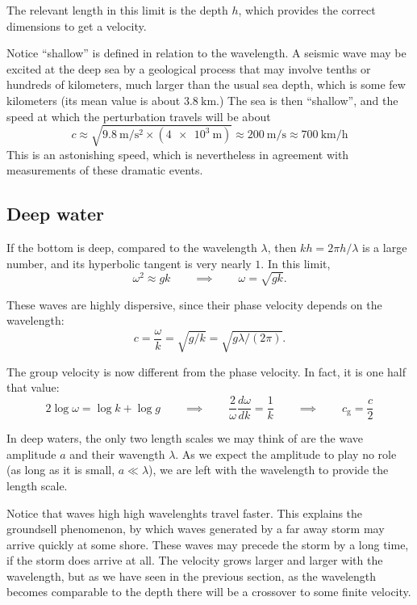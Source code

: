 The relevant length in this limit is the depth $h$, which provides the
correct dimensions to get a velocity.






Notice ``shallow'' is defined in relation to the wavelength. A seismic
wave may be excited at the deep sea by a geological process that may
involve tenths or hundreds of kilometers, much larger than the usual
sea depth, which is some few kilometers (its mean value is about
$\SI{3.8}{\kilo\meter}$.) The sea is then ``shallow'', and the speed
at which the perturbation travels will be about
\[
c \approx \sqrt{\SI{9.8}{\meter\per\second\squared} \times
  (\SI{4e3}{\meter}) } \approx \SI{200}{\meter\per\second}
  \approx \SI{700}{\kilo\meter\per\hour} 
\]
This is an astonishing speed, which is nevertheless in agreement with
measurements of these dramatic events.

\subsection{Deep water}

If the bottom is deep, compared to the wavelength $\lambda$, then $kh
= 2\pi h / \lambda $ is a large number, and its hyperbolic tangent is
very nearly $1$. In this limit,
\begin{equation}
  \label{eq:water_disp_deep}
  \omega^2 \approx g  k \qquad \implies \qquad \omega= \sqrt{g k} .
\end{equation}

These waves are highly dispersive, since their phase velocity depends
on the wavelength:
\[
c =  \frac{\omega}{k} = \sqrt{ g /k  } =  \sqrt{ g \lambda / (2\pi)  }  .
\]

The group velocity is now different from the phase velocity. In fact,
it is one half that value:
\[
2 \log\omega = \log k + \log g \qquad \implies \qquad
\frac{2}{\omega} \frac{d\omega}{dk} = \frac1{k} \qquad  \implies \qquad
c_\mathrm{g} = \frac{c}{2}
\]

In deep waters, the only two length scales we may think of are the
wave amplitude $a$ and their wavength $\lambda$. As we expect the
amplitude to play no role (as long as it is small, $a\ll\lambda$), we
are left with the wavelength to provide the length scale.

Notice that waves high high wavelenghts travel faster. This explains
the groundsell phenomenon, by which waves generated by a far away
storm may arrive quickly at some shore. These waves may precede the
storm by a long time, if the storm does arrive at all. The velocity
grows larger and larger with the wavelength, but as we have seen in
the previous section, as the wavelength becomes comparable to the
depth there will be a crossover to some finite velocity.

